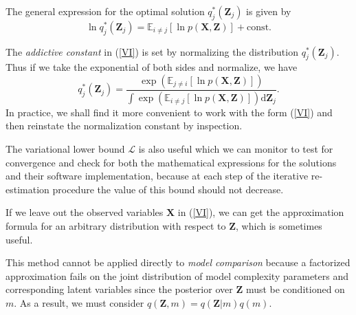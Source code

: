 \documentclass[a4paper]{report}
\newcommand{\ud}{\mathrm{d}}
\newcommand{\up}{\mathrm}
\renewcommand{\bf}{\mathbf}
\renewcommand{\cal}{\mathcal}
\newcommand{\bb}{\mathbb}
\newcommand{\imp}[1]{{\color{blue}\textit{#1}}}
\begin{document}
The general expression for the optimal solution $q_j^*(\bf{Z}_j)$ is given by
\begin{equation}
	\ln q_j^*(\bf{Z}_j) = \bb{E}_{i \neq j} [\ln p(\bf{X,Z})] + \up{const}. \label{VI}
\end{equation}

The \imp{addictive constant} in (\ref{VI}) is set by normalizing the distribution $q_j^*(\bf{Z}_j)$. Thus if we take the exponential of both sides and normalize, we have
\begin{equation}
	q_j^*(\bf{Z}_j) = \frac{\exp(\bb{E}_{j\neq i}[\ln p(\bf{X,Z})])}{\int \exp(\bb{E}_{i\neq j}[\ln p(\bf{X,Z})])\ud \bf{Z}_j}.
\end{equation}
In practice, we shall find it more convenient to work with the form (\ref{VI}) and then reinstate the normalization constant by inspection. 

The variational lower bound $\cal{L}$ is also useful which we can monitor to test for convergence and check for both the mathematical expressions for the solutions and their software implementation, because at each step of the iterative re-estimation procedure the value of this bound should not decrease.

If we leave out the observed variables $\bf{X}$ in (\ref{VI}), we can get the approximation formula for an arbitrary distribution with respect to $\bf{Z}$, which is sometimes useful.

This method cannot be applied directly to \imp{model comparison} because a factorized approximation fails on the joint distribution of model complexity parameters and corresponding latent variables since the posterior over $\bf{Z}$ must be conditioned on $m$. As a result, we must consider $q(\bf{Z},m) = q(\bf{Z}|m)q(m)$.
\end{document}
